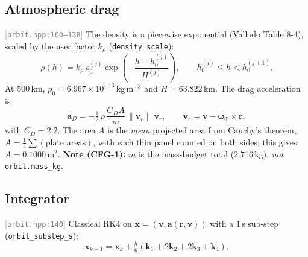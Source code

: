 \documentclass[11pt,a4paper]{article}
\newcommand{\vb}[1]{\boldsymbol{#1}}
\newcommand{\code}[1]{\texttt{#1}}
\newcommand{\src}[1]{\textcolor{gray}{\small[\texttt{#1}]}}
\begin{document}
\subsection{Atmospheric drag}\label{sec:drag} \src{orbit.hpp:100--138}
The density is a piecewise exponential (Vallado Table 8-4), scaled by the user factor $k_\rho$ (\code{density\_scale}):
\begin{equation}
\rho(h) = k_\rho\,\rho_0^{(j)}\exp\!\left(-\frac{h - h_0^{(j)}}{H^{(j)}}\right),\qquad h_0^{(j)}\le h < h_0^{(j+1)} .
\end{equation}
At 500\,km, $\rho_0 = 6.967\times10^{-13}$\,kg\,m$^{-3}$ and $H = 63.822$\,km. The drag acceleration is
\begin{equation}
\vb a_D = -\tfrac12\,\rho\,\frac{C_D A}{m}\,\lVert\vb v_r\rVert\,\vb v_r,\qquad \vb v_r = \vb v - \vb\omega_\oplus\times\vb r,
\end{equation}
with $C_D = 2.2$. The area $A$ is the \emph{mean} projected area from Cauchy's theorem, $A = \tfrac14\sum(\text{plate areas})$, with each thin panel counted on both sides; this gives $A = 0.1000$\,m$^2$. \textbf{Note (CFG-1):} $m$ is the mass-budget total (2.716\,kg), \emph{not} \code{orbit.mass\_kg}.

\subsection{Integrator} \src{orbit.hpp:140}
Classical RK4 on $\dot{\vb x} = (\vb v, \vb a(\vb r,\vb v))$ with a 1\,s sub-step (\code{orbit\_substep\_s}):
\begin{equation}
\vb x_{k+1} = \vb x_k + \tfrac{h}{6}(\vb k_1 + 2\vb k_2 + 2\vb k_3 + \vb k_4).
\end{equation}

\end{document}
